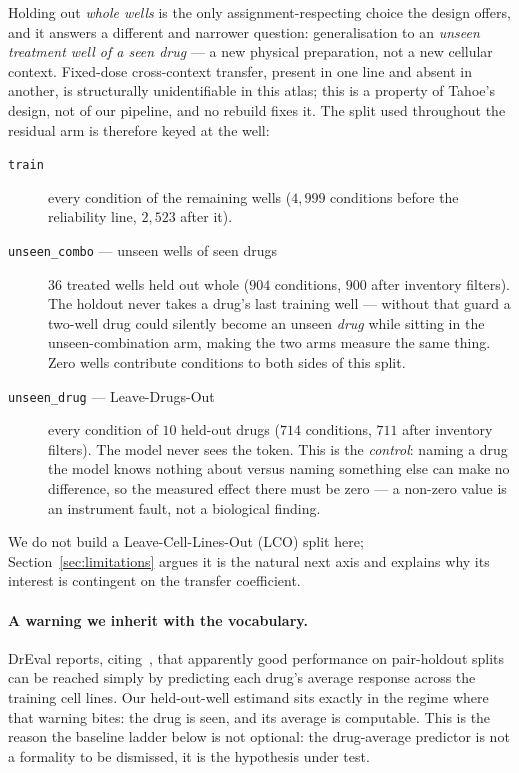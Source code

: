 Holding out \emph{whole wells} is the only assignment-respecting choice the design offers, and it
answers a different and narrower question: generalisation to an \emph{unseen treatment well of a
seen drug} --- a new physical preparation, not a new cellular context. Fixed-dose cross-context
transfer, present in one line and absent in another, is structurally unidentifiable in this atlas;
this is a property of Tahoe's design, not of our pipeline, and no rebuild fixes it. The split used
throughout the residual arm is therefore keyed at the well:
\begin{description}
  \item[\texttt{train}] every condition of the remaining wells ($4{,}999$ conditions before the
        reliability line, $2{,}523$ after it).
  \item[\texttt{unseen\_combo} --- unseen wells of seen drugs] $36$ treated wells held out whole
        ($904$ conditions, $900$ after inventory filters). The holdout never takes a drug's last
        training well --- without that guard a two-well drug could silently become an unseen
        \emph{drug} while sitting in the unseen-combination arm, making the two arms measure the
        same thing. Zero wells contribute conditions to both sides of this split.
  \item[\texttt{unseen\_drug} --- Leave-Drugs-Out] every condition of $10$ held-out drugs ($714$
        conditions, $711$ after inventory filters). The model never sees the token. This is the
        \emph{control}: naming a drug the model knows nothing about versus naming something else can
        make no difference, so the measured effect there must be zero --- a non-zero value is an
        instrument fault, not a biological finding.
\end{description}

We do not build a Leave-Cell-Lines-Out (LCO) split here; Section~\ref{sec:limitations} argues it is
the natural next axis and explains why its interest is contingent on the transfer coefficient.

\paragraph{A warning we inherit with the vocabulary.} DrEval reports, citing~\cite{partin}, that
apparently good performance on pair-holdout splits can be reached simply by predicting each drug's
average response across the training cell lines. Our held-out-well estimand sits exactly in the
regime where that warning bites: the drug is seen, and its average is computable. This is the
reason the baseline ladder below is not optional: the drug-average predictor is not a formality to
be dismissed, it is the hypothesis under test.


